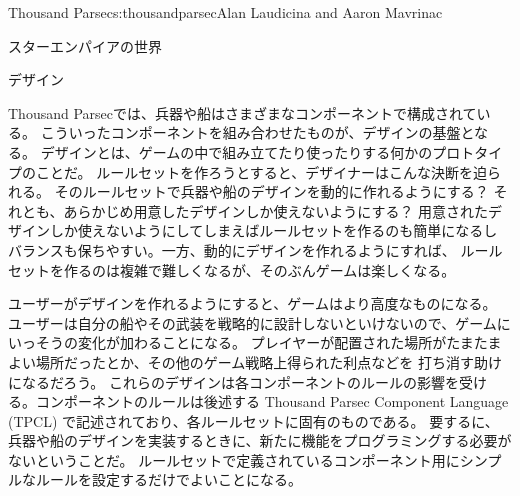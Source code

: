 \begin{aosachapter}{Thousand Parsec}{s:thousandparsec}{Alan Laudicina and Aaron Mavrinac}
\begin{aosasect1}{スターエンパイアの世界}
\begin{aosasect2}{デザイン}

Thousand Parsecでは、兵器や船はさまざまなコンポーネントで構成されている。
こういったコンポーネントを組み合わせたものが、デザインの基盤となる。
デザインとは、ゲームの中で組み立てたり使ったりする何かのプロトタイプのことだ。
ルールセットを作ろうとすると、デザイナーはこんな決断を迫られる。
そのルールセットで兵器や船のデザインを動的に作れるようにする？
それとも、あらかじめ用意したデザインしか使えないようにする？
用意されたデザインしか使えないようにしてしまえばルールセットを作るのも簡単になるし
バランスも保ちやすい。一方、動的にデザインを作れるようにすれば、
ルールセットを作るのは複雑で難しくなるが、そのぶんゲームは楽しくなる。

ユーザーがデザインを作れるようにすると、ゲームはより高度なものになる。
ユーザーは自分の船やその武装を戦略的に設計しないといけないので、ゲームにいっそうの変化が加わることになる。
プレイヤーが配置された場所がたまたまよい場所だったとか、その他のゲーム戦略上得られた利点などを
打ち消す助けになるだろう。
これらのデザインは各コンポーネントのルールの影響を受ける。コンポーネントのルールは後述する
Thousand Parsec Component Language (TPCL)
で記述されており、各ルールセットに固有のものである。
要するに、兵器や船のデザインを実装するときに、新たに機能をプログラミングする必要がないということだ。
ルールセットで定義されているコンポーネント用にシンプルなルールを設定するだけでよいことになる。


\end{aosasect2}
\end{aosasect1}
\end{aosachapter}
